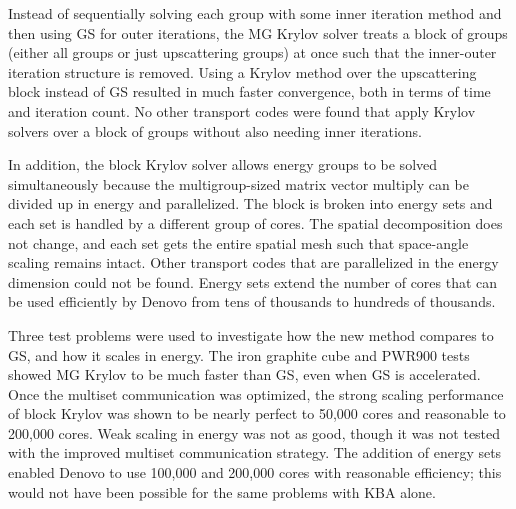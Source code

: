 Instead of sequentially solving each group with some inner iteration method and then using GS for outer iterations, the MG Krylov solver treats a block of groups (either all groups or just upscattering groups) at once such that the inner-outer iteration structure is removed. Using a Krylov method over the upscattering block instead of GS resulted in much faster convergence, both in terms of time and iteration count. No other transport codes were found that apply Krylov solvers over a block of groups without also needing inner iterations. 

In addition, the block Krylov solver allows energy groups to be solved simultaneously because the multigroup-sized matrix vector multiply can be divided up in energy and parallelized. The block is broken into energy sets and each set is handled by a different group of cores. The spatial decomposition does not change, and each set gets the entire spatial mesh such that space-angle scaling remains intact.  Other \Sn transport codes that are parallelized in the energy dimension could not be found. Energy sets extend the number of cores that can be used efficiently by Denovo from tens of thousands to hundreds of thousands. 

Three test problems were used to investigate how the new method compares to GS, and how it scales in energy. The iron graphite cube and PWR900 tests showed MG Krylov to be much faster than GS, even when GS is accelerated. Once the multiset communication was optimized, the strong scaling performance of block Krylov was shown to be nearly perfect to 50,000 cores and reasonable to 200,000 cores. Weak scaling in energy was not as good, though it was not tested with the improved multiset communication strategy. The addition of energy sets enabled Denovo to use 100,000 and 200,000 cores with reasonable efficiency; this would not have been possible for the same problems with KBA alone. 


